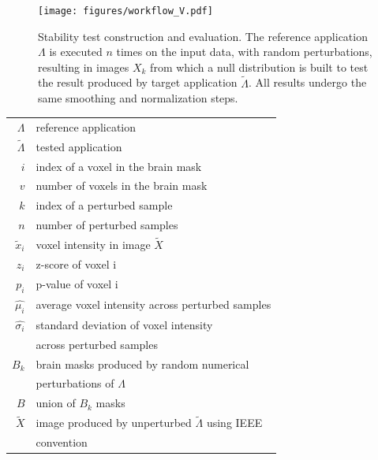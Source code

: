 \documentclass[lettersize,journal]{IEEEtran}
\begin{document}
\begin{figure}
  \centering
  \texttt{[image: figures/workflow\_V.pdf]}
  \caption{Stability test construction and evaluation. The reference application $\Lambda$ is executed $n$ times on the input data, with random perturbations, resulting in images $X_k$ from which a null distribution is built to test the result produced by target application $\tilde \Lambda$. All results undergo the same smoothing and normalization steps.}
  \label{fig:test_workflow}
\end{figure}
\begin{table}
  \centering
  \begin{tabular}{r|l}
    $\Lambda$          & reference application                                     \\
    $\tilde \Lambda$   & tested application                                        \\
    $i$                & index of a voxel in the brain mask                        \\
    $v$                & number of voxels in the brain mask                        \\
    $k$                & index of a perturbed sample                               \\
    $n$                & number of perturbed samples                               \\
    $\tilde x_i$       & voxel intensity in image $\tilde X$                       \\
    $z_i$              & z-score of voxel i                                        \\
    $p_i$              & p-value of voxel i                                        \\
    $\hat{\mu_i}$      & average voxel intensity across perturbed samples          \\
    $\hat{\sigma_i}$   & standard deviation of voxel intensity                     \\ & across perturbed samples       \\
    $B_k$              & brain masks produced by random numerical                  \\ & perturbations of $\Lambda$  \\
    $B$                & union of $B_k$ masks                                      \\
    $\tilde X$         & image produced by unperturbed $\tilde \Lambda$ using IEEE \\ & convention \\

\end{tabular}
\end{table}
\end{document}
